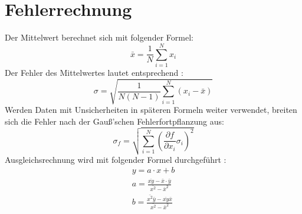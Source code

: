 \section{Fehlerrechnung}
\label{sec:Fehlerrechnung}
Der Mittelwert berechnet sich mit folgender Formel:
\begin{equation}
  \bar{x} = \frac{1}{N} \sum_{i=1}^N x_i
\end{equation}
Der Fehler des Mittelwertes lautet entsprechend :
\begin{equation}
  \sigma = \sqrt{\frac{1}{N(N-1)} \sum_{i=1}^N (x_i - \bar{x})}
\end{equation}
Werden Daten mit Unsicherheiten in späteren Formeln weiter verwendet, breiten sich die Fehler nach der Gauß'schen Fehlerfortpflanzung aus:
\begin{equation}
  \sigma_f = \sqrt{
      \sum\limits_{i = 1}^N
       \left( \frac{\partial f}{\partial x_i} \sigma_i \right)^{\!\! 2}
     }
\end{equation}
Ausgleichsrechnung wird mit folgender Formel durchgeführt :
\begin{align}
  y = a \cdot x + b \\
  a = \frac{\overline{xy}-\bar{x}\cdot\bar{y}}{\bar{x^2}-\bar{x}^2} \\
  b = \frac{\bar{x^2}\bar{y}-\overline{xy}\bar{x}}{\bar{x^2}-\bar{x}^2}
\end{align}

